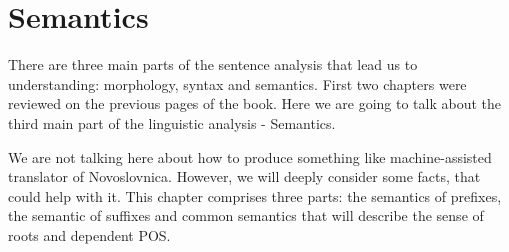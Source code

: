 \chapter{Semantics}

There are three main parts of the sentence analysis that lead us to understanding: morphology, syntax and semantics. First two chapters were reviewed on the previous pages of the book. Here we are going to talk about the third main part of the linguistic analysis - Semantics.

We are not talking here about how to produce something like machine-assisted translator of Novoslovnica. However, we will deeply consider some facts, that could help with it. 
This chapter comprises three parts: the semantics of prefixes, the semantic of suffixes and common semantics that will describe the sense of roots and dependent POS.



